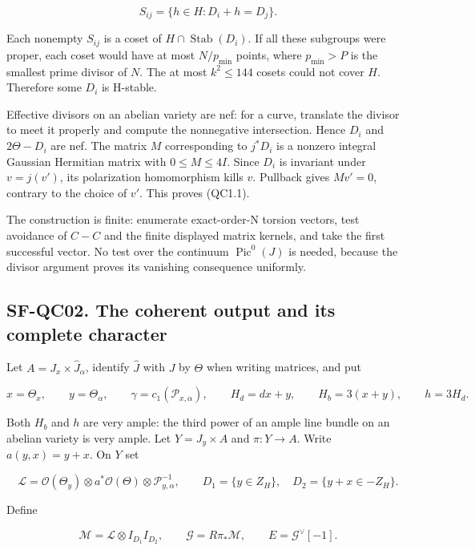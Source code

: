 \[
 S_{ij}=\{h\in H:D_i+h=D_j\}.
\]

Each nonempty \(S_{ij}\) is a coset of
\(H\cap \operatorname{Stab}(D_i)\). If all these subgroups were proper,
each coset would have at most \(N/p_{\min}\) points, where
\(p_{\min}>P\) is the smallest prime divisor of \(N\). The at most
\(k^{2}\le 144\) cosets could not cover \(H\). Therefore some \(D_i\) is
H-stable.

Effective divisors on an abelian variety are nef: for a curve, translate
the divisor to meet it properly and compute the nonnegative
intersection. Hence \(D_i\) and \(2\Theta -D_i\) are nef. The matrix
\(M\) corresponding to \(j^*D_i\) is a nonzero integral Gaussian
Hermitian matrix with \(0\le M\le 4I\). Since \(D_i\) is invariant under
\(v=j(v')\), its polarization homomorphism kills \(v\). Pullback gives
\(Mv'=0\), contrary to the choice of \(v'\). This proves (QC1.1).

The construction is finite: enumerate exact-order-N torsion vectors,
test avoidance of \(C-C\) and the finite displayed matrix kernels, and
take the first successful vector. No test over the continuum
\(\operatorname{Pic}^{0}(J)\) is needed, because the divisor argument
proves its vanishing consequence uniformly.

\subsection{SF-QC02. The coherent output and its complete
character}\label{SF-QC02}

Let \(A=J_x\times \widehat{J}_\alpha\), identify \(\widehat{J}\) with
\(J\) by \(\Theta\) when writing matrices, and put

\[
 x=\Theta_x,\qquad y=\Theta_\alpha,\qquad
 \gamma=c_1(\mathcal P_{x,\alpha}),\qquad
 H_d=dx+y,\qquad H_b=3(x+y),\qquad h=3H_d.
\]

Both \(H_b\) and \(h\) are very ample: the third power of an ample line
bundle on an abelian variety is very ample. Let \(Y=J_y\times A\) and
\(\pi :Y\to A\). Write \(a(y,x)=y+x\). On \(Y\) set

\[
 \mathcal L=\mathcal O(\Theta_y)\otimes a^*\mathcal O(\Theta)
                       \otimes\mathcal P_{y,\alpha}^{-1},
 \qquad D_1=\{y\in Z_H\},\quad D_2=\{y+x\in-Z_H\}.
\]

Define

\[
 \mathcal M=\mathcal L\otimes I_{D_1}I_{D_2},\qquad
 \mathcal G=R\pi_*\mathcal M,\qquad
 E=\mathcal G^\vee[-1].
 \tag{QC2.1}
\]

